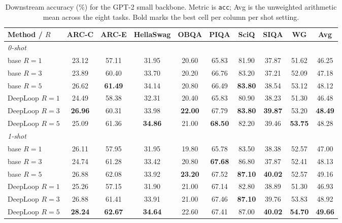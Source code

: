 \documentclass[11pt]{airesearch}
\begin{document}
\begin{table}[ht]
  \centering
  \footnotesize
  \caption{Downstream accuracy (\%) for the GPT-2 small backbone.
    Metric is \texttt{acc}; Avg is the unweighted arithmetic mean
    across the eight tasks. Bold marks the best cell per column per
    shot setting.}
  \label{tab:downstream-small}
  \begin{tabular}{lcccccccc c}
    \toprule
    Method / $R$ & ARC-C & ARC-E & HellaSwag & OBQA & PIQA & SciQ & SIQA & WG & \textbf{Avg} \\
    \midrule
    \multicolumn{10}{l}{\emph{0-shot}} \\
    base $R{=}1$         & 23.12 & 57.11 & 31.95 & 20.60 & 65.83 & 81.90 & 37.87 & 51.62 & 46.25 \\
    base $R{=}3$         & 23.89 & 60.40 & 33.70 & 20.20 & 66.76 & 83.20 & 37.21 & 52.09 & 47.18 \\
    base $R{=}5$         & 26.62 & \textbf{61.49} & 34.14 & 20.80 & 66.49 & \textbf{83.80} & 38.54 & 53.12 & 48.12 \\
    DeepLoop $R{=}1$     & 24.49 & 58.38 & 32.31 & 20.40 & 65.83 & 80.90 & 38.23 & 51.30 & 46.48 \\
    DeepLoop $R{=}3$     & \textbf{26.96} & 60.31 & 33.98 & \textbf{22.00} & 67.79 & \textbf{83.80} & \textbf{39.87} & 53.20 & \textbf{48.49} \\
    DeepLoop $R{=}5$     & 25.09 & 61.36 & \textbf{34.86} & 21.00 & \textbf{68.50} & 82.20 & 39.46 & \textbf{53.75} & 48.28 \\
    \midrule
    \multicolumn{10}{l}{\emph{1-shot}} \\
    base $R{=}1$         & 26.11 & 57.95 & 31.95 & 19.80 & 65.78 & 83.50 & 38.38 & 52.57 & 47.00 \\
    base $R{=}3$         & 24.74 & 61.28 & 33.42 & 20.80 & \textbf{67.68} & 86.80 & 37.87 & 52.41 & 48.13 \\
    base $R{=}5$         & 26.88 & 62.08 & 33.92 & \textbf{23.20} & 67.52 & \textbf{87.10} & \textbf{40.02} & 52.57 & 49.16 \\
    DeepLoop $R{=}1$     & 25.26 & 57.15 & 31.90 & 21.00 & 67.14 & 82.80 & 38.89 & 51.30 & 46.93 \\
    DeepLoop $R{=}3$     & 26.88 & 61.41 & 33.91 & 21.00 & 67.46 & \textbf{87.10} & 39.76 & 53.83 & 48.92 \\
    DeepLoop $R{=}5$     & \textbf{28.24} & \textbf{62.67} & \textbf{34.64} & 22.60 & 67.41 & 87.00 & \textbf{40.02} & \textbf{54.70} & \textbf{49.66} \\
    \bottomrule
  \end{tabular}
\end{table}
\end{document}
